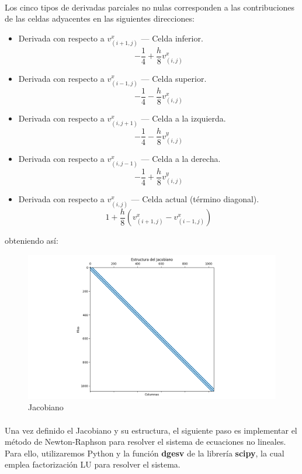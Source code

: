 \documentclass{article}
\begin{document}
  \paragraph{}
  Los cinco tipos de derivadas parciales no nulas corresponden a las contribuciones de las celdas adyacentes en las siguientes direcciones:
  \begin{itemize}
      \item Derivada con respecto a \(v_{(i+1, j)}^x\) — Celda inferior.
      \[-\frac{1}{4}+\frac{h}{8}v_{(i,j)}^x\]
      \item Derivada con respecto a \(v_{(i-1, j)}^x\) — Celda superior.
      \[-\frac{1}{4}-\frac{h}{8}v_{(i,j)}^x\]
      \item Derivada con respecto a \(v_{(i, j+1)}^x\) — Celda a la izquierda.
      \[-\frac{1}{4}-\frac{h}{8}v_{(i,j)}^y\]
      \item Derivada con respecto a \(v_{(i, j-1)}^x\) — Celda a la derecha.
      \[-\frac{1}{4}+\frac{h}{8}v_{(i,j)}^y\]
      \item Derivada con respecto a \(v_{(i, j)}^x\) — Celda actual (término diagonal).
      \[1+\frac{h}{8}(v_{(i+1,j)}^x-v_{(i-1,j)}^x)\]
  \end{itemize}

  obteniendo así:

  \begin{figure}[H]
    \centering
    \includegraphics[width=1\textwidth]{Jacobiano.png}
    \caption{Jacobiano}
  \end{figure}

  \paragraph{}
  Una vez definido el Jacobiano y su estructura, el siguiente paso es implementar el método de Newton-Raphson para resolver el sistema de ecuaciones no lineales. Para ello, utilizaremos Python y la función \textbf{dgesv} de la librería \textbf{scipy}, la cual emplea factorización LU para resolver el sistema.
\end{document}
